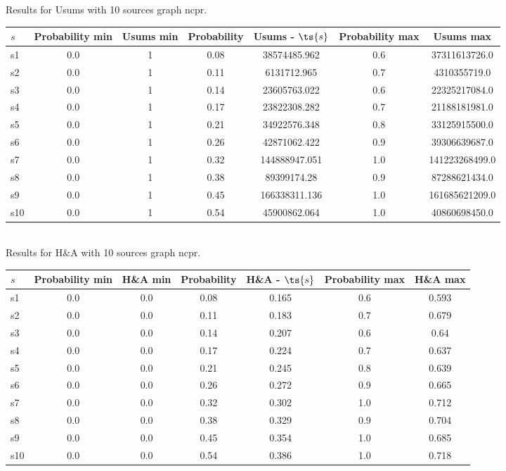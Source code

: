 \documentclass{article}
\begin{document}
\noindent Results for Usums with 10 sources graph ncpr.

\noindent\begin{tabular}{|l|c|c|c|c|c|c|}
\hline
$s$& Probability min & Usums min & Probability & Usums - $\ts{s}$ & Probability max & Usums max\\
\hline
s1 &0.0 & 1 & 0.08 & 38574485.962 & 0.6 & 37311613726.0\\
\hline
s2 &0.0 & 1 & 0.11 & 6131712.965 & 0.7 & 4310355719.0\\
\hline
s3 &0.0 & 1 & 0.14 & 23605763.022 & 0.6 & 22325217084.0\\
\hline
s4 &0.0 & 1 & 0.17 & 23822308.282 & 0.7 & 21188181981.0\\
\hline
s5 &0.0 & 1 & 0.21 & 34922576.348 & 0.8 & 33125915500.0\\
\hline
s6 &0.0 & 1 & 0.26 & 42871062.422 & 0.9 & 39306639687.0\\
\hline
s7 &0.0 & 1 & 0.32 & 144888947.051 & 1.0 & 141223268499.0\\
\hline
s8 &0.0 & 1 & 0.38 & 89399174.28 & 0.9 & 87288621434.0\\
\hline
s9 &0.0 & 1 & 0.45 & 166338311.136 & 1.0 & 161685621209.0\\
\hline
s10 &0.0 & 1 & 0.54 & 45900862.064 & 1.0 & 40860698450.0\\
\hline
\end{tabular}\\

\noindent Results for H\&A with 10 sources graph ncpr.

\noindent\begin{tabular}{|l|c|c|c|c|c|c|}
\hline
$s$& Probability min & H\&A min & Probability & H\&A - $\ts{s}$ & Probability max & H\&A max\\
\hline
s1 &0.0 & 0.0 & 0.08 & 0.165 & 0.6 & 0.593\\
\hline
s2 &0.0 & 0.0 & 0.11 & 0.183 & 0.7 & 0.679\\
\hline
s3 &0.0 & 0.0 & 0.14 & 0.207 & 0.6 & 0.64\\
\hline
s4 &0.0 & 0.0 & 0.17 & 0.224 & 0.7 & 0.637\\
\hline
s5 &0.0 & 0.0 & 0.21 & 0.245 & 0.8 & 0.639\\
\hline
s6 &0.0 & 0.0 & 0.26 & 0.272 & 0.9 & 0.665\\
\hline
s7 &0.0 & 0.0 & 0.32 & 0.302 & 1.0 & 0.712\\
\hline
s8 &0.0 & 0.0 & 0.38 & 0.329 & 0.9 & 0.704\\
\hline
s9 &0.0 & 0.0 & 0.45 & 0.354 & 1.0 & 0.685\\
\hline
s10 &0.0 & 0.0 & 0.54 & 0.386 & 1.0 & 0.718\\
\hline
\end{tabular}\\
\end{document}
